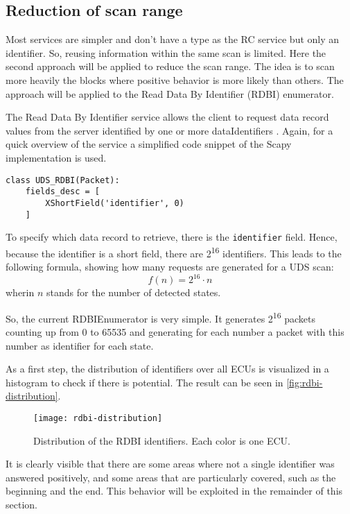 \subsection{Reduction of scan range}
Most services are simpler and don't have a type as the RC service but only an identifier. So, reusing information within the same scan is limited. Here the second approach will be applied to reduce the scan range. The idea is to scan more heavily the blocks where positive behavior is more likely than others. The approach will be applied to the Read Data By Identifier (RDBI) enumerator.

The Read Data By Identifier service allows the client to request data record values from the server identified by one or more dataIdentifiers \cite{iso14229}. Again, for a quick overview of the service a simplified code snippet of the Scapy implementation is used.

\begin{samepage}
\begin{verbatim}
class UDS_RDBI(Packet):
    fields_desc = [
        XShortField('identifier', 0)
    ]
\end{verbatim}
\end{samepage}

To specify which data record to retrieve, there is the \texttt{identifier} field. Hence, because the identifier is a short field, there are 2\textsuperscript{16} identifiers. This leads to the following formula, showing how many requests are generated for a UDS scan:
\[f(n)=2^{16} \cdot n\]
wherin $n$ stands for the number of detected states. 

So, the current RDBIEnumerator is very simple. It generates 2\textsuperscript{16} packets counting up from 0 to 65535 and generating for each number a packet with this number as identifier for each state.

As a first step, the distribution of identifiers over all ECUs is visualized in a histogram to check if there is potential. The result can be seen in \autoref{fig:rdbi-distribution}.

\begin{figure}[h]
    \centering
    \texttt{[image: rdbi-distribution]}
    \caption{Distribution of the RDBI identifiers. Each color is one ECU.}
    \label{fig:rdbi-distribution}
\end{figure}

It is clearly visible that there are some areas where not a single identifier was answered positively, and some areas that are particularly covered, such as the beginning and the end. This behavior will be exploited in the remainder of this section.

